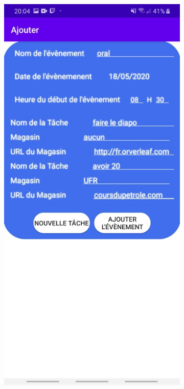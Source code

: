 \documentclass[12pt,a4paper]{report}
\begin{document}
\begin{flushleft}
\begin{figure}
\begin{subfigure}[b]{0.3\textwidth}
        \includegraphics[width=\textwidth]{FormWTask}
    \end{subfigure}

\end{figure}
\end{flushleft}
\end{document}
